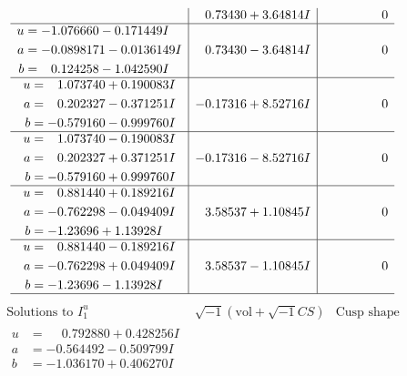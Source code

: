 \documentclass[1p]{elsarticle_modified}
\theoremstyle{definition}
\newcommand{\I}{\sqrt{-1}}
\begin{document}
$$\begin{array}{c|c|c}
 & \phantom{-}0.73430 + 3.64814 I & \phantom{-0.000000 } 0 \\ \hline\begin{aligned}
u &= -1.076660 - 0.171449 I \\
a &= -0.0898171 - 0.0136149 I \\
b &= \phantom{-}0.124258 - 1.042590 I\end{aligned}
 & \phantom{-}0.73430 - 3.64814 I & \phantom{-0.000000 } 0 \\ \hline\begin{aligned}
u &= \phantom{-}1.073740 + 0.190083 I \\
a &= \phantom{-}0.202327 - 0.371251 I \\
b &= -0.579160 - 0.999760 I\end{aligned}
 & -0.17316 + 8.52716 I & \phantom{-0.000000 } 0 \\ \hline\begin{aligned}
u &= \phantom{-}1.073740 - 0.190083 I \\
a &= \phantom{-}0.202327 + 0.371251 I \\
b &= -0.579160 + 0.999760 I\end{aligned}
 & -0.17316 - 8.52716 I & \phantom{-0.000000 } 0 \\ \hline\begin{aligned}
u &= \phantom{-}0.881440 + 0.189216 I \\
a &= -0.762298 - 0.049409 I \\
b &= -1.23696 + 1.13928 I\end{aligned}
 & \phantom{-}3.58537 + 1.10845 I & \phantom{-0.000000 } 0 \\ \hline\begin{aligned}
u &= \phantom{-}0.881440 - 0.189216 I \\
a &= -0.762298 + 0.049409 I \\
b &= -1.23696 - 1.13928 I\end{aligned}
 & \phantom{-}3.58537 - 1.10845 I & \phantom{-0.000000 } 0\\
 \hline 
 \end{array}$$\newpage$$\begin{array}{c|c|c}  
\text{Solutions to }I^u_{1}& \I (\text{vol} + \sqrt{-1}CS) & \text{Cusp shape}\\
 \hline 
\begin{aligned}
u &= \phantom{-}0.792880 + 0.428256 I \\
a &= -0.564492 - 0.509799 I \\
b &= -1.036170 + 0.406270 I\end{aligned}

\end{array}$$
\end{document}
